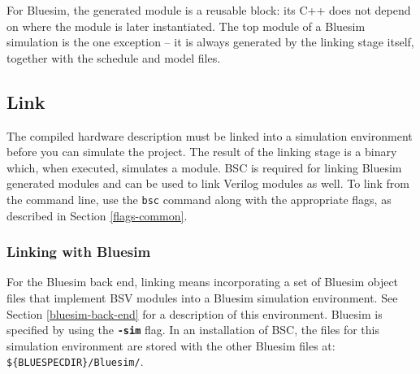 \documentclass{article}
\newcommand{\te}[1]{\texttt{#1}}
\begin{document}
For Bluesim, the generated module is a reusable block: its C++ does
not depend on where the module is later instantiated.  The top module
of a Bluesim simulation is the one exception -- it is always generated
by the linking stage itself, together with the schedule and model
files.


\subsection{Link}
\label{sec-link}

The compiled  hardware description  must be linked into a simulation
environment before you can simulate the project.  The result of the linking
stage is a binary which, when executed,
simulates a module.
BSC is required for linking  Bluesim generated modules and can
be used to link Verilog modules as well.
To link from the command line, use the \te{bsc}
command along with the appropriate flags, as described in Section \ref{flags-common}.



\subsubsection{Linking with Bluesim}

For the Bluesim back end, linking means incorporating a set of Bluesim object
files that implement BSV modules into a Bluesim simulation
environment.  See Section \ref{bluesim-back-end} for a description of this
environment.  Bluesim is specified by using the {\bf\tt -sim} flag.
In an installation of BSC, the files for
this simulation environment are stored with the other Bluesim files
at: \verb|${BLUESPECDIR}/Bluesim/|.
\end{document}
